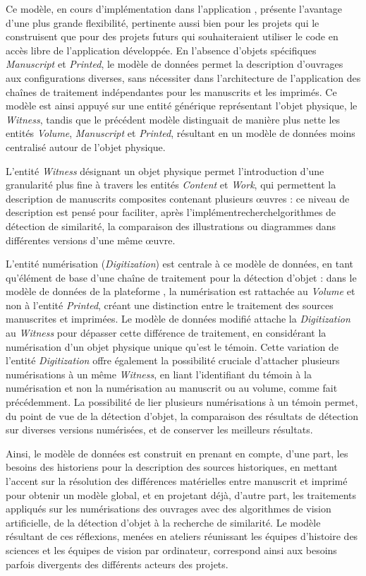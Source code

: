     Ce modèle, en cours d'implémentation dans l'application \eida, présente l'avantage d'une plus grande flexibilité, pertinente aussi bien pour les projets qui le construisent que pour des projets futurs qui souhaiteraient utiliser le code en accès libre de l'application développée. En l'absence d'objets spécifiques \textit{Manuscript} et \textit{Printed}, le modèle de données permet la description d'ouvrages aux configurations diverses, sans nécessiter dans l'architecture de l'application des chaînes de traitement indépendantes pour les manuscrits et les imprimés. Ce modèle est ainsi appuyé sur une entité générique représentant l’objet physique, le \textit{Witness}, tandis que le précédent modèle distinguait de manière plus nette les entités \textit{Volume}, \textit{Manuscript} et \textit{Printed}, résultant en un modèle de données moins centralisé autour de l'objet physique.
    
    L'entité \textit{Witness} désignant un objet physique permet l'introduction d'une granularité plus fine à travers les entités \textit{Content} et \textit{Work}, qui permettent la description de manuscrits composites contenant plusieurs œuvres : ce niveau de description est pensé pour faciliter, après l'implémentrecherchelgorithmes de détection de similarité, la comparaison des illustrations ou diagrammes dans différentes versions d'une même œuvre.
    
    L'entité numérisation (\textit{Digitization}) est centrale à ce modèle de données, en tant qu'élément de base d'une chaîne de traitement pour la détection d'objet : dans le modèle de données de la plateforme \vhs, la numérisation est rattachée au \textit{Volume} et non à l'entité \textit{Printed}, créant une distinction entre le traitement des sources manuscrites et imprimées. Le modèle de données modifié attache la \textit{Digitization} au \textit{Witness} pour dépasser cette différence de traitement, en considérant la numérisation d'un objet physique unique qu'est le témoin. Cette variation de l'entité \textit{Digitization} offre également la possibilité cruciale d'attacher plusieurs numérisations à un même \textit{Witness}, en liant l'identifiant du témoin à la numérisation et non la numérisation au manuscrit ou au volume, comme fait précédemment. La possibilité de lier plusieurs numérisations à un témoin permet, du point de vue de la détection d'objet, la comparaison des résultats de détection sur diverses versions numérisées, et de conserver les meilleurs résultats.
    
    Ainsi, le modèle de données est construit en prenant en compte, d'une part, les besoins des historiens pour la description des sources historiques, en mettant l'accent sur la résolution des différences matérielles entre manuscrit et imprimé pour obtenir un modèle global, et en projetant déjà, d'autre part, les traitements appliqués sur les numérisations des ouvrages avec des algorithmes de vision artificielle, de la détection d'objet à la recherche de similarité. Le modèle résultant de ces réflexions, menées en ateliers réunissant les équipes d'histoire des sciences et les équipes de vision par ordinateur, correspond ainsi aux besoins parfois divergents des différents acteurs des projets.

